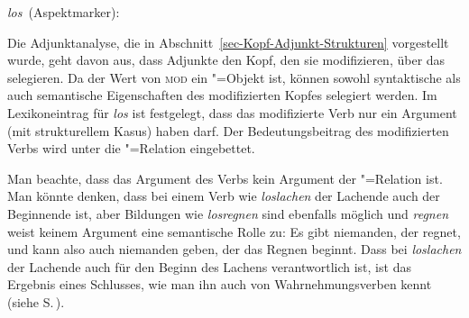 \eas
\label{le-los-asp}%
\mbox{\emph{los} (Aspektmarker):}\\
\zs{}

\noindent
Die Adjunktanalyse, die in Abschnitt~\ref{sec-Kopf-Adjunkt-Strukturen} vorgestellt wurde,
geht davon aus, dass Adjunkte den Kopf, den sie modifizieren, über das \modm selegieren.
Da der Wert von \textsc{mod} ein "=Objekt ist, können sowohl syntaktische als auch semantische
Eigenschaften des modifizierten Kopfes selegiert werden. Im Lexikoneintrag für \emph{los}
ist festgelegt, dass das modifizierte Verb nur ein Argument (mit strukturellem Kasus)
haben darf. Der Bedeutungsbeitrag des modifizierten Verbs wird unter die "=Relation
eingebettet.

Man beachte, dass das Argument des Verbs kein Argument der "=Relation ist. Man
könnte denken, dass bei einem Verb wie \emph{loslachen} der Lachende auch der Beginnende ist, aber
Bildungen wie \emph{losregnen} sind ebenfalls möglich und \emph{regnen} weist keinem Argument
eine semantische Rolle zu: Es gibt niemanden, der regnet, und kann also auch niemanden geben, der
das Regnen beginnt. 
Dass bei \emph{loslachen} der Lachende auch für den Beginn des Lachens
verantwortlich ist, ist das Ergebnis eines Schlusses, wie man ihn auch von Wahrnehmungsverben kennt
(siehe S.\,\pageref{ex-AcI-Verben-und-Rollen}).
\largerpage

